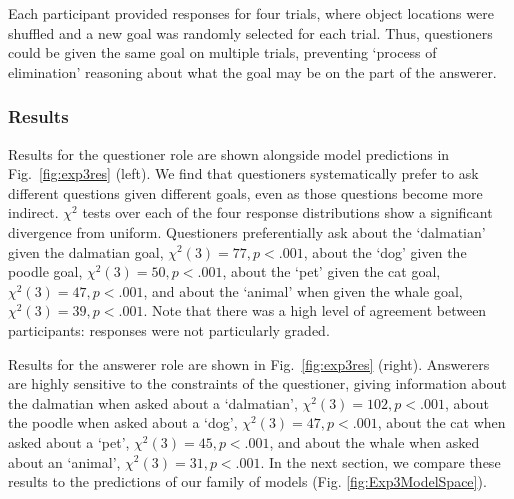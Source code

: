 \documentclass[12pt, floatsintext, jou]{apa6}
\begin{document}
Each participant provided responses for four trials, where object locations were shuffled and a new goal was randomly selected for each trial. Thus, questioners could be given the same goal on multiple trials, preventing `process of elimination' reasoning about what the goal may be on the part of the answerer. 

\subsubsection{Results}
Results for the questioner role are shown alongside model predictions in Fig.~\ref{fig:exp3res} (left). We find that questioners systematically prefer to ask different questions given different goals, even as those questions become more indirect. $\chi^2$ tests over each of the four response distributions show a significant divergence from uniform. Questioners preferentially ask about the `dalmatian' given the  dalmatian goal, ${\chi^2(3) = 77}, {p < .001}$, about the `dog' given the poodle goal, ${\chi^2(3) = 50}, {p <.001}$, about the `pet' given the cat goal, ${\chi^2(3) = 47},  {p <.001}$, and about the `animal' when given the whale goal, ${\chi^2(3) = 39}, {p <.001}$. Note that there was a high level of agreement between participants: responses were not particularly graded.

Results for the answerer role are shown in Fig.~\ref{fig:exp3res} (right). Answerers are highly sensitive to the constraints of the questioner, giving information about the dalmatian when asked about a `dalmatian', ${\chi^2(3) = 102}, {p <.001}$, about the poodle when asked about a `dog', ${\chi^2(3) = 47}, {p <.001}$, about the cat when asked about a `pet', ${\chi^2(3) = 45}, {p<.001}$, and about the whale when asked about an `animal', ${\chi^2(3) = 31}, {p < .001}$. In the next section, we compare these results to the predictions of our family of models (Fig. \ref{fig:Exp3ModelSpace}). 
\end{document}
